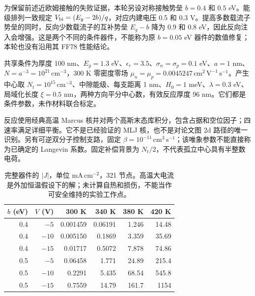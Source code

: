 \documentclass[11pt,a4paper]{article}
\begin{document}
{\cjkfont 为保留前述近欧姆接触的失败证据，本轮另设对称接触势垒}\allowbreak{} $b=0.4$ {\cjkfont 和}\allowbreak{} $0.5$ eV{\cjkfont 。能级排列一致规定}\allowbreak{} $V_{\rm bi}=(E_g-2b)/q${\cjkfont ，对应内建电压}\allowbreak{} 0.5 {\cjkfont 和}\allowbreak{} 0.3 V{\cjkfont 。提高多数载流子势垒的同时，反向少数载流子的互补势垒}\allowbreak{} $E_g-b$ {\cjkfont 降为}\allowbreak{} 0.9 {\cjkfont 和}\allowbreak{} 0.8 eV{\cjkfont ，因此反向注入会增强。这是两个不同的条件器件，不能称为原}\allowbreak{} $b=0.05$ eV {\cjkfont 器件的数值修复；本轮也没有沿用其}\allowbreak{} FF78 {\cjkfont 性能结论。}\allowbreak{}

{\cjkfont 共享条件为厚度}\allowbreak{} 100 nm{\cjkfont 、}\allowbreak{}$E_g=1.3$ eV{\cjkfont 、}\allowbreak{}$\epsilon_r=3.5${\cjkfont 、}\allowbreak{}$\sigma_n=\sigma_p=0.1$ eV{\cjkfont 、}\allowbreak{}$a=1$ nm{\cjkfont 、}\allowbreak{}$N=a^{-3}=10^{21}\,\mathrm{cm^{-3}}${\cjkfont ，}\allowbreak{}300 K {\cjkfont 零密度零场}\allowbreak{} $\mu_n=\mu_p=0.0045247\,\mathrm{cm^2\,V^{-1}\,s^{-1}}${\cjkfont 。产生中心取}\allowbreak{} $N_t=10^{15}\,\mathrm{cm^{-3}}${\cjkfont 、中隙能级、每支距离}\allowbreak{} 1 nm{\cjkfont 、}\allowbreak{}$H_0=1$ meV{\cjkfont 、}\allowbreak{}$\lambda=0.3$ eV{\cjkfont 、局域化长度}\allowbreak{} $\xi=0.5$ nm{\cjkfont ，两种方向平分中心数，有效反应厚度}\allowbreak{} 96 nm{\cjkfont 。它们都是条件参数，未作材料联合标定。}\allowbreak{}

{\cjkfont 反应使用经典高温}\allowbreak{} Marcus {\cjkfont 核并对两个高斯末态库积分，包含占据和空位因子；四速率满足详细平衡。它不是已经验证的}\allowbreak{} MLJ {\cjkfont 核，也不是对论文图}\allowbreak{} 2d {\cjkfont 路径的唯一识别。另有可逆双分子控制支路，固定}\allowbreak{} $\beta=10^{-11}\,\mathrm{cm^3\,s^{-1}}${\cjkfont ；该唯象参数不能直接称为已确定的}\allowbreak{} Langevin {\cjkfont 系数。固定补偿背景为}\allowbreak{} $N_t/2${\cjkfont ，不代表孤立中心具有半整数电荷。}\allowbreak{}

\begin{table}[htbp]\centering\small
\begin{tabular}{rrrrrr}\toprule
$b$ (eV)&$V$ (V)&300 K&340 K&380 K&420 K\\\midrule
0.4&$-5$&0.001459&0.06191&1.246&14.48\\
0.4&$-10$&0.005150&0.1869&3.359&35.69\\
0.4&$-15$&0.01717&0.5072&7.878&74.86\\
0.5&$-5$&0.06458&1.771&24.89&215.4\\
0.5&$-10$&0.2291&5.435&68.54&545.8\\
0.5&$-15$&0.7559&14.79&161.7&1154\\\bottomrule
\end{tabular}
\caption{{\cjkfont 完整器件的}\allowbreak{} $|J|${\cjkfont ，单位}\allowbreak{} $\mathrm{mA\,cm^{-2}}${\cjkfont ，}\allowbreak{}321 {\cjkfont 节点。高温大电流是外加恒温假设下的解；未计算自热和损伤，不能当作可安全维持的实验工作点。}\allowbreak{}}
\end{table}
\end{document}
